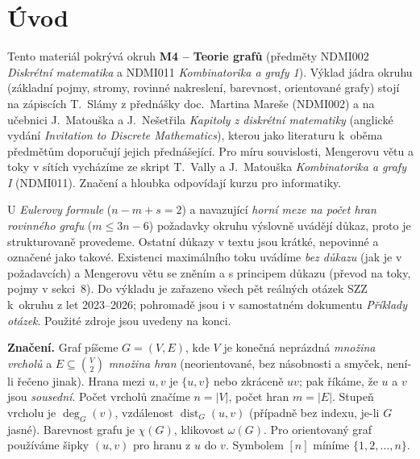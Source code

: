 \documentclass[11pt,a4paper]{article}
\DeclareMathOperator{\dist}{dist}
\newcommand{\chrom}{\chi}
\newcommand{\klik}{\omega}
\begin{document}
\maketitle
\tableofcontents
\bigskip

\section*{Úvod}

Tento materiál pokrývá okruh \textbf{M4 -- Teorie grafů} (předměty NDMI002 \emph{Diskrétní matematika} a NDMI011 \emph{Kombinatorika a grafy 1}). Výklad jádra okruhu (základní pojmy, stromy, rovinné nakreslení, barevnost, orientované grafy) stojí na zápiscích T.~Slámy z přednášky doc.~Martina Mareše (NDMI002) a na učebnici J.~Matouška a J.~Nešetřila \emph{Kapitoly z diskrétní matematiky} (anglické vydání \emph{Invitation to Discrete Mathematics}), kterou jako literaturu k~oběma předmětům doporučují jejich přednášející. Pro míru souvislosti, Mengerovu větu a toky v sítích vycházíme ze skript T.~Vally a J.~Matouška \emph{Kombinatorika a grafy I} (NDMI011). Značení a hloubka odpovídají kurzu pro informatiky.

U \emph{Eulerovy formule} ($n-m+s=2$) a navazující \emph{horní meze na počet hran rovinného grafu} ($m\le 3n-6$) požadavky okruhu výslovně uvádějí důkaz, proto je strukturovaně provedeme. Ostatní důkazy v textu jsou krátké, nepovinné a označené jako takové. Existenci maximálního toku uvádíme \emph{bez důkazu} (jak je v požadavcích) a Mengerovu větu se zněním a s principem důkazu (převod na toky, pojmy v sekci~8). Do výkladu je zařazeno všech pět reálných otázek SZZ k~okruhu z let 2023--2026; pohromadě jsou i v samostatném dokumentu \emph{Příklady otázek}. Použité zdroje jsou uvedeny na konci.

\medskip
\noindent\textbf{Značení.} Graf píšeme $G=(V,E)$, kde $V$ je konečná neprázdná \emph{množina vrcholů} a $E\subseteq\binom{V}{2}$ \emph{množina hran} (neorientované, bez násobnosti a smyček, není-li řečeno jinak). Hrana mezi $u,v$ je $\{u,v\}$ nebo zkráceně $uv$; pak říkáme, že $u$ a $v$ jsou \emph{sousední}. Počet vrcholů značíme $n=|V|$, počet hran $m=|E|$. Stupeň vrcholu je $\deg_G(v)$, vzdálenost $\dist_G(u,v)$ (případně bez indexu, je-li $G$ jasné). Barevnost grafu je $\chrom(G)$, klikovost $\klik(G)$. Pro orientovaný graf používáme šipky $(u,v)$ pro hranu z $u$ do $v$. Symbolem $[n]$ míníme $\{1,2,\dots,n\}$.

\end{document}
